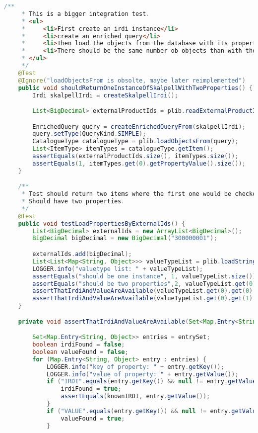 \begin{lstlisting}[caption=Beispiel eines Integrationstests, language=Java, label=lst:integrationstest_beispiel]
    /**
     * This is a bigger integration test.
     * <ul>
     *     <li>First create an irdi instance</li>
     *     <li>create an enriched query</li>
     *     <li>Then load the objects from the database with its properties</li>
     *     <li>There should be the same number ob objects than with the previous check</li>
     * </ul>
     */
    @Test
    @Ignore("loadObjectsFrom is obsolte, maybe later reimplemented")
    public void shouldReturnOneInstanceOfSkalpellWithTwoProperties() {
        Irdi skalpellIrdi = createSkalpellIrdi();

        List<BigDecimal> externalProductIds = plib.readExternalProductIdsBy(skalpellIrdi);

        EnrichedQuery query = createEnrichedQueryFrom(skalpellIrdi);
        query.setType(QueryKind.SIMPLE);
        CatalogueType catalogueType = plib.loadObjectsFrom(query);
        List<ItemType> itemTypes = catalogueType.getItem();
        assertEquals(externalProductIds.size(), itemTypes.size());
        assertEquals(1, itemTypes.get(0).getPropertyValue().size());
    }

    /**
     * Test should return two items where the first one would be checked.
     * Should have two properties.
     */
    @Test
    public void testLoadPropertiesByExternalIds() {
        List<BigDecimal> externalIds = new ArrayList<BigDecimal>();
        BigDecimal bigDecimal = new BigDecimal("300000001");

        externalIds.add(bigDecimal);
        List<List<Map<String, Object>>> valueTypeList = plib.loadStringPropertiesByExternalIds(externalIds);
        LOGGER.info("valuetype list: " + valueTypeList);
        assertEquals("should be one instance", 1, valueTypeList.size());
        assertEquals("should be two properties",2, valueTypeList.get(0).size());
        assertThatIrdiAndValueAreAvailable(valueTypeList.get(0).get(0).entrySet(), "0173-1#02-AAA762#1");
        assertThatIrdiAndValueAreAvailable(valueTypeList.get(0).get(1).entrySet(), "0173-1#02-AAB011#1");
    }

    private void assertThatIrdiAndValueAreAvailable(Set<Map.Entry<String, Object>> entrySet, String knownIRDI) {

        Set<Map.Entry<String, Object>> entries = entrySet;
        boolean irdiFound = false;
        boolean valueFound = false;
        for (Map.Entry<String, Object> entry : entries) {
            LOGGER.info("key of property: " + entry.getKey());
            LOGGER.info("value of property: " + entry.getValue());
            if ("IRDI".equals(entry.getKey()) && null != entry.getValue() && !"null".equals(entry.getValue())) {
                irdiFound = true;
                assertEquals(knownIRDI, entry.getValue());
            }
            if ("VALUE".equals(entry.getKey()) && null != entry.getValue() && !"null".equals(entry.getValue())) {
                valueFound = true;
            }


\end{lstlisting}
